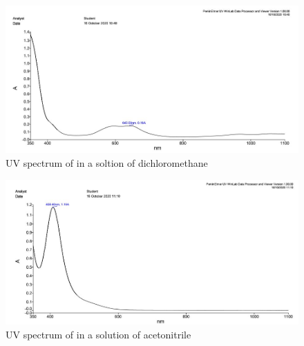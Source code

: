 \documentclass{article}
\begin{document}
\begin{figure}[h]
    \centering
    \captionsetup{justification=centering}
    \includegraphics[width=\textwidth, height=\textheight, keepaspectratio]{cl.jpg}
    \caption{UV spectrum of  in a soltion of dichloromethane}
\end{figure}

\begin{figure}[h]
    \centering
    \captionsetup{justification=centering}
    \includegraphics[width=\textwidth, height=\textheight, keepaspectratio]{nc.jpg}
    \caption{UV spectrum of  in a solution of acetonitrile}
\end{figure}
\end{document}
